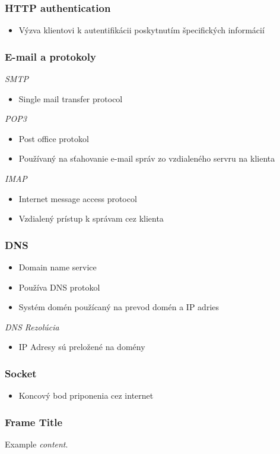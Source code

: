 \documentclass[10pt,xcolor=pdflatex,hyperref={unicode}]{beamer}
\begin{document}
    \begin{frame}
        \frametitle{HTTP authentication}
        \begin{itemize}
            \item Výzva klientovi k autentifikácii poskytnutím špecifických informácií
        \end{itemize}
    \end{frame}

    \begin{frame}
        \frametitle{E-mail a protokoly}
        \emph{SMTP}
        \begin{itemize}
            \item Single mail transfer protocol
        \end{itemize}
        \emph{POP3}
        \begin{itemize}
            \item Post office protokol
            \item Používaný na sťahovanie e-mail správ zo vzdialeného servru na klienta
        \end{itemize}
        \emph{IMAP}
        \begin{itemize}
            \item Internet message access protocol
            \item Vzdialený prístup k správam cez klienta
        \end{itemize}
    \end{frame}

    \begin{frame}\frametitle{DNS}
        \begin{itemize}
            \item Domain name service
            \item Používa DNS protokol
            \item Systém domén použícaný na prevod domén a IP adries
        \end{itemize}
        \emph{DNS Rezolúcia}
        \begin{itemize}
            \item IP Adresy sú preložené na domény
        \end{itemize}
    \end{frame}

    \begin{frame}\frametitle{Socket}
        \begin{itemize}
            \item Koncový bod priponenia cez internet
        \end{itemize}
    \end{frame}

    \begin{frame}
        \frametitle{Frame Title}
        Example \emph{content}.
    \end{frame}

\end{document}
